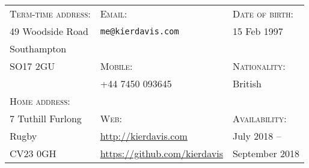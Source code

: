  \vspace{-1em}
\hrulefill
\vspace{1em}

{
  \newcommand{\h}[1]{\textsc{#1}:}
  \newcommand{\n}[1]{\hspace{.8em} #1}
  \begin{tabu} to \textwidth {X[1.4,l] X[2.3,l] X[1.4,l]}
    \h{Term-time address} & \h{Email}                                 & \h{Date of birth}  \\
    \n{49 Woodside Road}  & \n{\texttt{me@kierdavis.com}}             & \n{15 Feb 1997}    \\
    \n{Southampton}       &                                           &                    \\
    \n{SO17 2GU}          & \h{Mobile}                                & \h{Nationality}    \\
                          & \n{+44 7450 093645}                       & \n{British}        \\
    \h{Home address}      &                                           &                    \\
    \n{7 Tuthill Furlong} & \h{Web}                                   & \h{Availability}   \\
    \n{Rugby}             & \n{\url{http://kierdavis.com}}            & \n{July 2018 --}   \\
    \n{CV23 0GH}          & \n{\url{https://github.com/kierdavis}}    & \n{September 2018} \\
  \end{tabu}
}

\hrulefill
